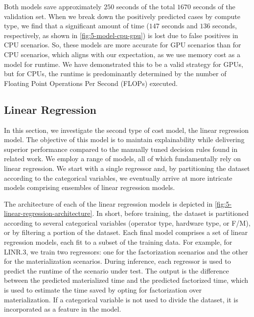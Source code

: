 Both models save approximately $250$ seconds of the total $1670$ seconds of the validation set. When we break down the positively predicted cases by compute type, we find that a significant amount of time ($147$ seconds and $136$ seconds, respectively, as shown in \autoref{fig:5-model-cpu-gpu}) is lost due to false positives in CPU scenarios. So, these models are more accurate for GPU scenarios than for CPU scenarios, which aligns with our expectation, as we use memory cost as a model for runtime. We have demonstrated this to be a valid strategy for GPUs, but for CPUs, the runtime is predominantly determined by the number of Floating Point Operations Per Second (FLOPs) executed.


\subsection{Linear Regression}
\label{subsec:5-linear-regression}
In this section, we investigate the second type of cost model, the linear regression model. The objective of this model is to maintain explainability while delivering superior performance compared to the manually tuned decision rules found in related work. We employ a range of models, all of which fundamentally rely on linear regression. We start with a single regressor and, by partitioning the dataset according to the categorical variables, we eventually arrive at more intricate models comprising ensembles of linear regression models.

The architecture of each of the linear regression models is depicted in \autoref{fig:5-linear-regression-architecture}. In short, before training, the dataset is partitioned according to several categorical variables (operator type, hardware type, or F/M), or by filtering a portion of the dataset. Each final model comprises a set of linear regression models, each fit to a subset of the training data. For example, for LINR.3, we train two regressors: one for the factorization scenarios and the other for the materialization scenarios. During inference, each regressor is used to predict the runtime of the scenario under test. The output is the difference between the predicted materialized time and the predicted factorized time, which is used to estimate the time saved by opting for factorization over materialization. If a categorical variable is not used to divide the dataset, it is incorporated as a feature in the model.

